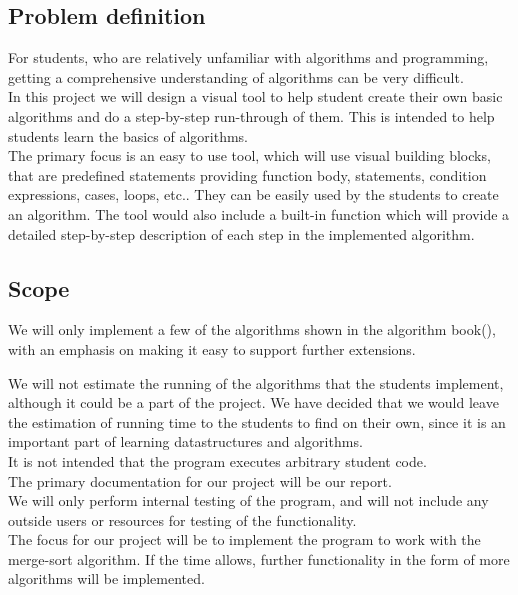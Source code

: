 \documentclass[11pt]{article}
\begin{document}
\subsection{Problem definition}
For students, who are relatively unfamiliar with algorithms and programming, getting a comprehensive understanding of algorithms can be very difficult.\\
In this project we will design a visual tool to help student create their own basic algorithms and do a step-by-step run-through of them.
This is intended to help students learn the basics of algorithms.\\
The primary focus is an easy to use tool, which will use visual building blocks, that are predefined statements providing function body, statements, condition expressions, cases, loops, etc.. They can be easily used by the students to create an algorithm. The tool would also include a built-in function which will provide a detailed step-by-step description of each step in the implemented algorithm.
\subsection{Scope}


We will only implement a few of the algorithms shown in the algorithm book(\citep{algbog}), with an emphasis on making it easy to support further extensions.

We will not estimate the running of the algorithms that the students implement, although it could be a part of the project. We have decided that we would leave the estimation of running time to the students to find on their own, since it is an important part of learning datastructures and algorithms.\\
It is not intended that the program executes arbitrary student code.\\
The primary documentation for our project will be our report.\\
We will only perform internal testing of the program, and will not include any outside users or resources for testing of the functionality.\\
The focus for our project will be to implement the program to work with the merge-sort algorithm. If the time allows, further functionality in the form of more algorithms will be implemented.
\end{document}
